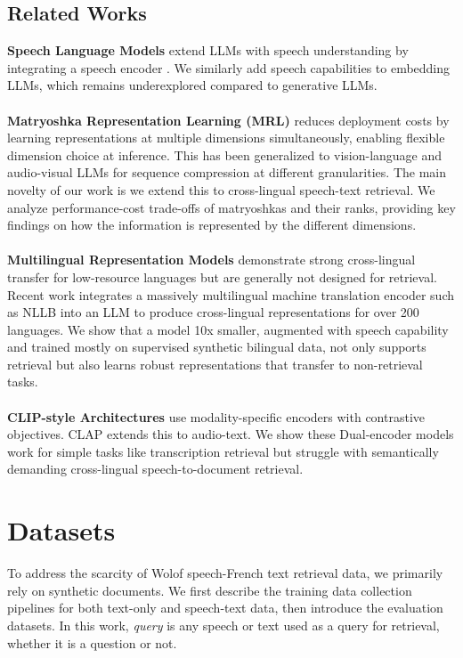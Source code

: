 \documentclass[11pt]{article}
\newcommand{\myparagraph}[1]{\noindent\textbf{#1}}
\begin{document}
\subsection{Related Works}
\myparagraph{Speech Language Models} extend LLMs with speech understanding by integrating a speech encoder \citep{llamaspeech, pareras2025revisitingdirectspeechtotexttranslation, slm_methods}. We similarly add speech capabilities to embedding LLMs, which remains underexplored compared to generative LLMs.
\\
\\
\myparagraph{Matryoshka Representation Learning (MRL)} \citep{MRL} reduces deployment costs by learning representations at multiple dimensions simultaneously, enabling flexible dimension choice at inference. This has been generalized to vision-language and audio-visual LLMs \citep{hu2024Matryoshkaquerytransformerlarge, cai2024Matryoshkamultimodalmodels, cappellazzo2025adaptiveaudiovisualspeechrecognition} for sequence compression at different granularities. The main novelty of our work is we extend this to cross-lingual speech-text retrieval. We analyze performance-cost trade-offs of matryoshkas and their ranks, providing key findings on how the information is represented by the different dimensions.
\\
\\
\myparagraph{Multilingual Representation Models} \citep{xlmr, mbert, mbart} demonstrate strong cross-lingual transfer for low-resource languages but are generally not designed for retrieval. Recent work \citep{nllbllm2vec} integrates a massively multilingual machine translation encoder such as NLLB into an LLM to produce cross-lingual representations for over 200 languages. We show that a model 10x smaller, augmented with speech capability and trained mostly on supervised synthetic bilingual data, not only supports retrieval but also learns robust representations that transfer to non-retrieval tasks.
\\
\\
\myparagraph{CLIP-style Architectures} \citep{clip} use modality-specific encoders with contrastive objectives. CLAP \citep{clap} extends this to audio-text. We show these Dual-encoder models work for simple tasks like transcription retrieval but struggle with semantically demanding cross-lingual speech-to-document retrieval.
\section{Datasets}
\label{sec:dataset}
To address the scarcity of Wolof speech-French text retrieval data, we primarily rely on synthetic documents. We first describe the training data collection pipelines for both text-only and speech-text data, then introduce the evaluation datasets. In this work, \textit{query} is any speech or text used as a query for retrieval, whether it is a question or not.
\end{document}
